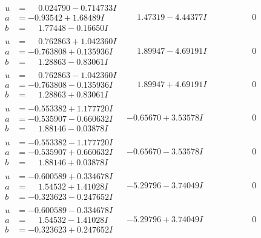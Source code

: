 \documentclass[1p]{elsarticle_modified}
\theoremstyle{definition}
\begin{document}
$$\begin{array}{c|c|c}
\begin{aligned}
u &= \phantom{-}0.024790 - 0.714733 I \\
a &= -0.93542 + 1.68489 I \\
b &= \phantom{-}1.77448 - 0.16650 I\end{aligned}
 & \phantom{-}1.47319 - 4.44377 I & \phantom{-0.000000 } 0 \\ \hline\begin{aligned}
u &= \phantom{-}0.762863 + 1.042360 I \\
a &= -0.763808 + 0.135936 I \\
b &= \phantom{-}1.28863 - 0.83061 I\end{aligned}
 & \phantom{-}1.89947 - 4.69191 I & \phantom{-0.000000 } 0 \\ \hline\begin{aligned}
u &= \phantom{-}0.762863 - 1.042360 I \\
a &= -0.763808 - 0.135936 I \\
b &= \phantom{-}1.28863 + 0.83061 I\end{aligned}
 & \phantom{-}1.89947 + 4.69191 I & \phantom{-0.000000 } 0 \\ \hline\begin{aligned}
u &= -0.553382 + 1.177720 I \\
a &= -0.535907 - 0.660632 I \\
b &= \phantom{-}1.88146 - 0.03878 I\end{aligned}
 & -0.65670 + 3.53578 I & \phantom{-0.000000 } 0 \\ \hline\begin{aligned}
u &= -0.553382 - 1.177720 I \\
a &= -0.535907 + 0.660632 I \\
b &= \phantom{-}1.88146 + 0.03878 I\end{aligned}
 & -0.65670 - 3.53578 I & \phantom{-0.000000 } 0 \\ \hline\begin{aligned}
u &= -0.600589 + 0.334678 I \\
a &= \phantom{-}1.54532 + 1.41028 I \\
b &= -0.323623 - 0.247652 I\end{aligned}
 & -5.29796 - 3.74049 I & \phantom{-0.000000 } 0 \\ \hline\begin{aligned}
u &= -0.600589 - 0.334678 I \\
a &= \phantom{-}1.54532 - 1.41028 I \\
b &= -0.323623 + 0.247652 I\end{aligned}
 & -5.29796 + 3.74049 I & \phantom{-0.000000 } 0 \\ \hline\begin{aligned}

\end{aligned}
\end{array}$$
\end{document}

